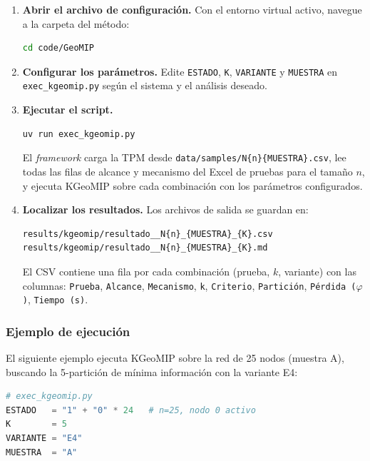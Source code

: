 \begin{enumerate}
  \item \textbf{Abrir el archivo de configuración.} Con el entorno virtual activo,
        navegue a la carpeta del método:
\begin{lstlisting}[language=bash]
cd code/GeoMIP
\end{lstlisting}

  \item \textbf{Configurar los parámetros.} Edite \texttt{ESTADO}, \texttt{K},
        \texttt{VARIANTE} y \texttt{MUESTRA} en \texttt{exec\_kgeomip.py} según
        el sistema y el análisis deseado.

  \item \textbf{Ejecutar el script.}
\begin{lstlisting}[language=bash]
uv run exec_kgeomip.py
\end{lstlisting}
        El \textit{framework} carga la TPM desde \texttt{data/samples/N\{n\}\{MUESTRA\}.csv},
        lee todas las filas de alcance y mecanismo del Excel de pruebas para el tamaño $n$,
        y ejecuta KGeoMIP sobre cada combinación con los parámetros configurados.

  \item \textbf{Localizar los resultados.} Los archivos de salida se guardan en:
\begin{lstlisting}
results/kgeomip/resultado__N{n}_{MUESTRA}_{K}.csv
results/kgeomip/resultado__N{n}_{MUESTRA}_{K}.md
\end{lstlisting}
        El CSV contiene una fila por cada combinación (prueba, $k$, variante) con las
        columnas: \texttt{Prueba}, \texttt{Alcance}, \texttt{Mecanismo}, \texttt{k},
        \texttt{Criterio}, \texttt{Partición}, \texttt{Pérdida ($\varphi$)},
        \texttt{Tiempo (s)}.
\end{enumerate}

\subsubsection{Ejemplo de ejecución}

El siguiente ejemplo ejecuta KGeoMIP sobre la red de 25 nodos (muestra A),
buscando la 5-partición de mínima información con la variante E4:

\begin{lstlisting}[language=Python]
# exec_kgeomip.py
ESTADO   = "1" + "0" * 24   # n=25, nodo 0 activo
K        = 5
VARIANTE = "E4"
MUESTRA  = "A"
\end{lstlisting}

